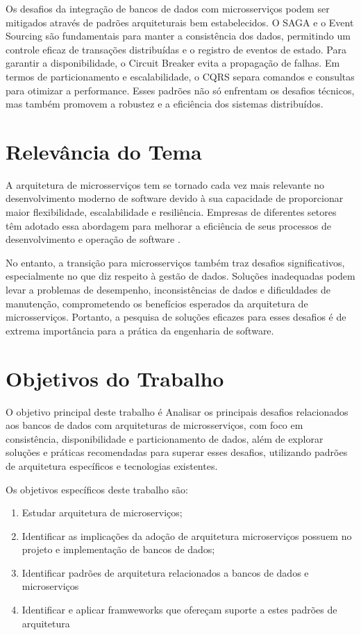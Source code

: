 Os desafios da integração de bancos de dados com microsserviços podem ser mitigados através de padrões arquiteturais bem estabelecidos. O SAGA e o Event Sourcing são fundamentais para manter a consistência dos dados, permitindo um controle eficaz de transações distribuídas e o registro de eventos de estado. Para garantir a disponibilidade, o Circuit Breaker evita a propagação de falhas. Em termos de particionamento e escalabilidade, o CQRS separa comandos e consultas para otimizar a performance. Esses padrões não só enfrentam os desafios técnicos, mas também promovem a robustez e a eficiência dos sistemas distribuídos.

\section{Relevância do Tema}

A arquitetura de microsserviços tem se tornado cada vez mais relevante no desenvolvimento moderno de software devido à sua capacidade de proporcionar maior flexibilidade, escalabilidade e resiliência. Empresas de diferentes setores têm adotado essa abordagem para melhorar a eficiência de seus processos de desenvolvimento e operação de software \cite{pautasso2017}.

No entanto, a transição para microsserviços também traz desafios significativos, especialmente no que diz respeito à gestão de dados. Soluções inadequadas podem levar a problemas de desempenho, inconsistências de dados e dificuldades de manutenção, comprometendo os benefícios esperados da arquitetura de microsserviços. Portanto, a pesquisa de soluções eficazes para esses desafios é de extrema importância para a prática da engenharia de software.

\section{Objetivos do Trabalho}

O objetivo principal deste trabalho é Analisar os principais desafios relacionados aos bancos de dados com arquiteturas de microsserviços, com foco em consistência, disponibilidade e particionamento de dados, além de explorar soluções e práticas recomendadas para superar esses desafios, utilizando padrões de arquitetura específicos e tecnologias existentes.

Os objetivos específicos deste trabalho são:

\begin{enumerate}
    \item Estudar arquitetura de microserviços;
    \item Identificar as implicações da adoção de arquitetura microserviços possuem no projeto e implementação de bancos de dados;
    \item Identificar padrões de arquitetura relacionados a bancos de dados e microserviços
    \item Identificar e aplicar framweworks que ofereçam suporte a estes padrões de arquitetura
\end{enumerate}

